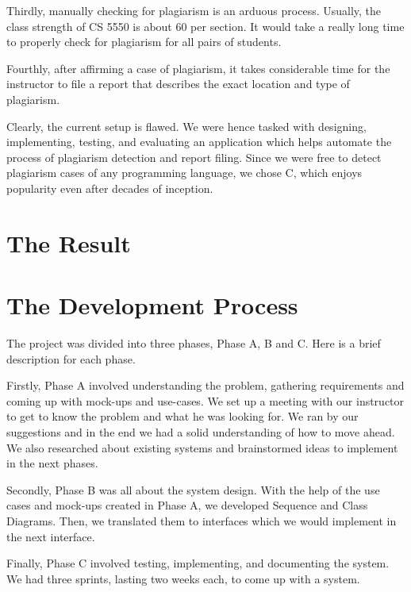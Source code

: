 \documentclass[12pt]{article}
\begin{document}
\par Thirdly, manually checking for plagiarism is an arduous process. Usually, the class strength of CS 5550 is about 60 per section. It would take a really long time to properly check for plagiarism for all pairs of students. 

\par Fourthly, after affirming a case of plagiarism, it takes considerable time for the instructor to file a report that describes the exact location and type of plagiarism.

\par Clearly, the current setup is flawed. We were hence tasked with designing, implementing, testing, and evaluating an application which helps automate the process of plagiarism detection and report filing. Since we were free to detect plagiarism cases of any programming language, we chose C, which enjoys popularity even after decades of inception.

\section{The Result}

\pagebreak
\section{The Development Process}
The project was divided into three phases, Phase A, B and C. Here is a brief description for each phase. 

\par Firstly, Phase A involved understanding the problem, gathering requirements and coming up with mock-ups and use-cases. We set up a meeting with our instructor to get to know the problem and what he was looking for. We ran by our suggestions and in the end we had a solid understanding of how to move ahead. We also researched about existing systems and brainstormed ideas to implement in the next phases. 

\par Secondly, Phase B was all about the system design. With the help of the use cases and mock-ups created in Phase A, we developed Sequence and Class Diagrams. Then, we translated them to interfaces which we would implement in the next interface. 

\par Finally, Phase C involved testing, implementing, and documenting the system. We had three sprints, lasting two weeks each, to come up with a system. 
\end{document}
